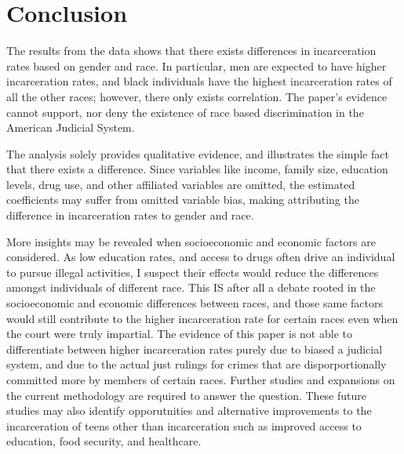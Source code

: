 \documentclass{article}
\begin{document}
\section{Conclusion}

The results from the data shows that there exists differences in incarceration rates based on gender and race. In particular, men are expected to have higher incarceration rates, and black individuals have the highest incarceration rates of all the other races; however, there only exists correlation. The paper's evidence cannot support, nor deny the existence of race based discrimination in the American Judicial System. 

The analysis solely provides qualitative evidence, and illustrates the simple fact that there exists a difference. Since variables like income, family size, education levels, drug use, and other affiliated variables are omitted, the estimated coefficients may suffer from omitted variable bias, making attributing the difference in incarceration rates to gender and race. 

More insights may be revealed when socioeconomic and economic factors are considered. As low education rates, and access to drugs often drive an individual to pursue illegal activities, I suspect their effects would reduce the differences amongst individuals of different race. This IS after all a debate rooted in the socioeconomic and economic differences between races, and those same factors would still contribute to the higher incarceration rate for certain races even when the court were truly impartial. The evidence of this paper is not able to differentiate between higher incarceration rates purely due to biased a judicial system, and due to the actual just rulings for crimes that are disporportionally committed more by members of certain races. Further studies and expansions on the current methodology are required to answer the question. These future studies may also identify opporutnities and alternative improvements to the incarceration of teens other than incarceration such as improved access to education, food security, and healthcare.
\end{document}

